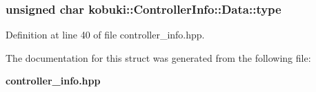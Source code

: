 \subsubsection[{type}]{\setlength{\rightskip}{0pt plus 5cm}unsigned char {\bf kobuki\-::\-Controller\-Info\-::\-Data\-::type}}\label{structkobuki_1_1ControllerInfo_1_1Data_a8cb641d536f39a15967a2a50273e3a16}


\-Definition at line 40 of file controller\-\_\-info.\-hpp.



\-The documentation for this struct was generated from the following file\-:\begin{DoxyCompactItemize}
\item 
{\bf controller\-\_\-info.\-hpp}\end{DoxyCompactItemize}
